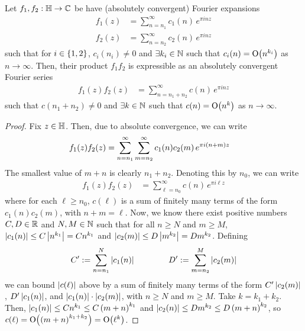 \begin{boxproposition}\label{Ch4:Prop:PolyGrowth_of_mul}
    Let $f_1, f_2 : \mathbb{H} \to \mathbb{C}$ be have (absolutely convergent) Fourier expansions
    \begin{align*}
        f_1(z) &= \sum_{n=n_1}^{\infty} c_1(n) \, e^{\pi i n z} \\
        f_2(z) &= \sum_{n=n_2}^{\infty} c_2(n) \, e^{\pi i n z}
    \end{align*}
    such that for $i \in \left\{ 1, 2 \right\}$, $c_i(n_i) \neq 0$ and $\exists k_i \in \mathbb{N}$ such that $c_i(n) = \operatorname{O}\!\left( n^{k_i} \right)$ as $n \to \infty$. Then, their product $f_1 f_2$ is expressible as an absolutely convergent Fourier series
    \begin{align*}
        f_1(z) f_2(z) &= \sum_{n = n_1 + n_2}^{\infty} c(n) \, e^{\pi i n z}
    \end{align*}
    such that $c(n_1 + n_2) \neq 0$ and $\exists k \in \mathbb{N}$ such that $c(n) = \operatorname{O}\!\left( n^k \right)$ as $n \to \infty$.
\end{boxproposition}
\begin{proof}
    Fix $z \in \mathbb{H}$. Then, due to absolute convergence, we can write
    \begin{align*}
        f_1(z) f_2(z)
        &= \sum_{n = n_1}^{\infty} \sum_{m = n_2}^{\infty} c_1(n) c_2(m) \, e^{\pi i \left( n + m \right) z}
    \end{align*}
    The smallest value of $m + n$ is clearly $n_1 + n_2$. Denoting this by $n_0$, we can write
    \begin{align*}
        f_1(z) f_2(z) &= \sum_{\ell = n_0}^{\infty} c(n) \, e^{\pi i \ell z}
    \end{align*}
    where for each $\ell \geq n_0$, $c(\ell)$ is a sum of finitely many terms of the form $c_1(n) c_2(m)$, with $n + m = \ell$. Now, we know there exist positive numbers $C, D \in \mathbb{R}$ and $N, M \in \mathbb{N}$ such that for all $n \geq N$ and $m \geq M$, $\left\lvert c_1(n) \right\rvert \leq C \left\lvert n^{k_1} \right\rvert = C n^{k_1}$ and $\left\lvert c_2(m) \right\rvert \leq D \left\lvert m^{k_2} \right\rvert = D m^{k_2}$. Defining
    \begin{align*}
        C' := \sum_{n=n_1}^{N} \left\lvert c_1(n) \right\rvert
        \qquad \qquad
        D' := \sum_{m=n_2}^{M} \left\lvert c_2(m) \right\rvert
    \end{align*}
    we can bound $\left\lvert c(\ell) \right\rvert$ above by a sum of finitely many terms of the form $C' \left\lvert c_2(m) \right\rvert$, $D' \left\lvert c_1(n) \right\rvert$, and $\left\lvert c_1(n) \right\rvert \cdot \left\lvert c_2(m) \right\rvert$, with $n \geq N$ and $m \geq M$. Take $k = k_1 + k_2$. Then, $\left\lvert c_1(n) \right\rvert \leq C n^{k_1} \leq C \left( m+n \right)^{k_1}$ and $\left\lvert c_2(n) \right\rvert \leq D m^{k_2} \leq D \left( m+n \right)^{k_2}$, so $c(\ell) = \operatorname{O}\!\left( \left( m+n \right)^{k_1 + k_2} \right) = \operatorname{O}\!\left( \ell^k \right)$. %
\end{proof}

